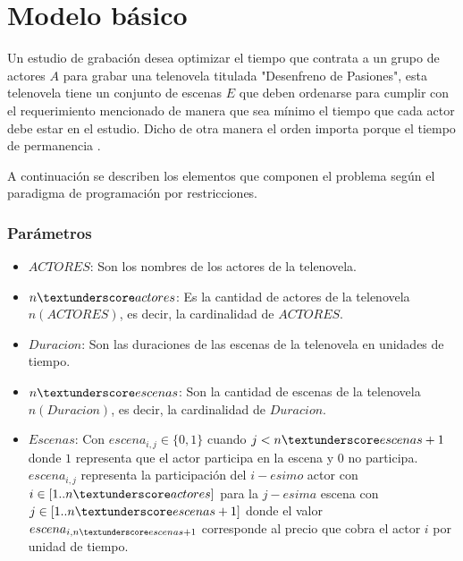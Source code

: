 \documentclass{article}
\begin{document}

\section{Modelo básico}
Un estudio de grabación desea optimizar el tiempo que contrata a un grupo de actores $A$ para grabar una telenovela titulada "Desenfreno de Pasiones", esta telenovela tiene un conjunto de escenas $E$ que deben ordenarse para cumplir con el requerimiento mencionado de manera que sea mínimo el tiempo que cada actor debe estar en el estudio. Dicho de otra manera el orden importa porque el tiempo de permanencia . \newline

A continuación se describen los elementos que componen el problema según el paradigma de programación por restricciones.

\subsubsection{Parámetros}
\begin{itemize}
    \item $ACTORES$: Son los nombres de los actores de la telenovela.
    \item $n\textunderscore actores$: Es la cantidad de actores de la telenovela $n(ACTORES)$, es decir, la cardinalidad de $ACTORES$.
    \item $Duracion$: Son las duraciones de las escenas de la telenovela en unidades de tiempo.
    \item $n\textunderscore escenas$: Son la cantidad de escenas de la telenovela $n(Duracion)$, es decir, la cardinalidad de $Duracion$.
    \item $Escenas$: Con $escena_{i,j} \in \{0,1\}$ cuando $j < n\textunderscore escenas + 1 $ donde  $1$ representa que el actor participa en la escena y $0$ no participa. $escena_{i,j}$ representa la participación del $i-esimo$ actor con $i \in [1..n\textunderscore actores]$ para la $j-esima$ escena con $j \in [1..n\textunderscore escenas + 1]$ donde el valor $escena_{i,n\textunderscore escenas + 1}$ corresponde al precio que cobra el actor $i$ por unidad de tiempo.
\end{itemize}
\end{document}
